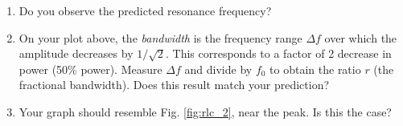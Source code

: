 \documentclass[12pt,twocolumn]{article}
\begin{document}
\begin{enumerate}
\item Do you observe the predicted resonance frequency?
\item On your plot above, the \textit{bandwidth} is the frequency range $\Delta f$ over which the amplitude decreases by $1/\sqrt{2}$.  This corresponds to a factor of 2 decrease in power (50\% power).  Measure $\Delta f$ and divide by $f_0$ to obtain the ratio $r$ (the fractional bandwidth).  Does this result match your prediction?
\item Your graph should resemble Fig. \ref{fig:rlc_2}, near the peak.  Is this the case?
\end{enumerate}
\end{document}
